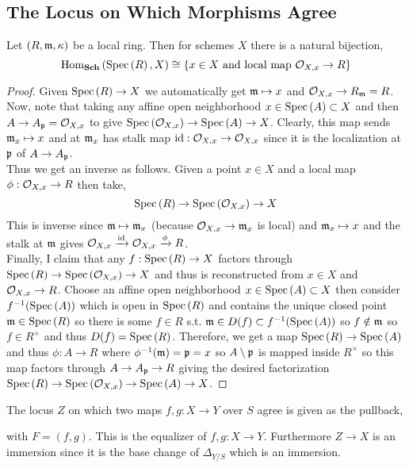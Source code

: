 \documentclass[12pt]{article}
\begin{document}
\subsection{The Locus on Which Morphisms Agree}

\begin{lemma}
Let $(R, \mathfrak{m}, \kappa)$ be a local ring. Then for schemes $X$ there is a natural bijection,
\[ \mathrm{Hom}_{\mathbf{Sch}} \left( \mathrm{Spec}\left( R \right), X \right) \cong \{ x \in X \text{ and local map } \mathcal{O}_{X, x} \to R \} \]
\end{lemma}

\begin{proof}
Given $\mathrm{Spec}\left( R \right) \to X$ we automatically get $\mathfrak{m} \mapsto x$ and $\mathcal{O}_{X, x} \to R_{\mathfrak{m}} = R$. 
Now, note that taking any affine open neighborhood $x \in \mathrm{Spec}\left( A \right) \subset X$ and then $A \to A_{\mathfrak{p}} = \mathcal{O}_{X, x}$ to give $\mathrm{Spec}\left( \mathcal{O}_{X, x} \right) \to \mathrm{Spec}\left( A \right) \to X$. Clearly, this map sends $\mathfrak{m}_x \mapsto x$ and at $\mathfrak{m}_x$ has stalk map $\mathrm{id} : \mathcal{O}_{X, x} \to \mathcal{O}_{X, x}$ since it is the localization at $\mathfrak{p}$ of $A \to A_{\mathfrak{p}}$. 
\bigskip\\
Thus we get an inverse as follows. Given a point $x \in X$ and a local map $\phi : \mathcal{O}_{X, x} \to R$ then take,
\[ \mathrm{Spec}\left( R \right) \to \mathrm{Spec}\left( \mathcal{O}_{X, x} \right) \to X \]
This is inverse since $\mathfrak{m} \mapsto \mathfrak{m}_x$ (because $\mathcal{O}_{X, x} \to \mathfrak{m}_x$ is local) and $\mathfrak{m}_x \mapsto x$ and the stalk at $\mathfrak{m}$ gives $\mathcal{O}_{X, x} \xrightarrow{\mathrm{id}} \mathcal{O}_{X, x} \xrightarrow{\phi} R$. 
\bigskip\\
Finally, I claim that any $f : \mathrm{Spec}\left( R \right) \to X$ factors through $\mathrm{Spec}\left( R \right) \to \mathrm{Spec}\left( \mathcal{O}_{X, x} \right) \to X$ and thus is reconstructed from $x \in X$ and $\mathcal{O}_{X, x} \to R$. Choose an affine open neighborhood $x \in \mathrm{Spec}\left( A \right) \subset X$ then consider $f^{-1}(\mathrm{Spec}\left( A \right))$ which is open in $\mathrm{Spec}\left( R \right)$ and contains the unique closed point $\mathfrak{m} \in \mathrm{Spec}\left( R \right)$ so there is some $f \in R$ s.t. $\mathfrak{m} \in D(f) \subset f^{-1}(\mathrm{Spec}\left( A \right))$ so $f \notin \mathfrak{m}$ so $f \in R^\times$ and thus $D(f) = \mathrm{Spec}\left( R \right)$. Therefore, we get a map $\mathrm{Spec}\left( R \right) \to \mathrm{Spec}\left( A \right)$ and thus $\phi : A \to R$ where $\phi^{-1}(\mathfrak{m}) = \mathfrak{p} = x$ so $A \setminus \mathfrak{p}$ is mapped inside $R^\times$ so this map factors through $A \to A_{\mathfrak{p}} \to R$ giving the desired factorization $\mathrm{Spec}\left( R \right) \to \mathrm{Spec}\left( \mathcal{O}_{X, x} \right) \to \mathrm{Spec}\left( A \right) \to X$.  
\end{proof}

\begin{definition}
The locus $Z$ on which two maps $f, g : X \to Y$ over $S$ agree is given as the pullback,
\begin{center}
\end{center}
with $F = (f, g)$. This is the equalizer of $f, g: X \to Y$. Furthermore $Z \to X$ is an immersion since it is the base change of $\Delta_{Y/S}$ which is an immersion.
\end{definition}
\end{document}

